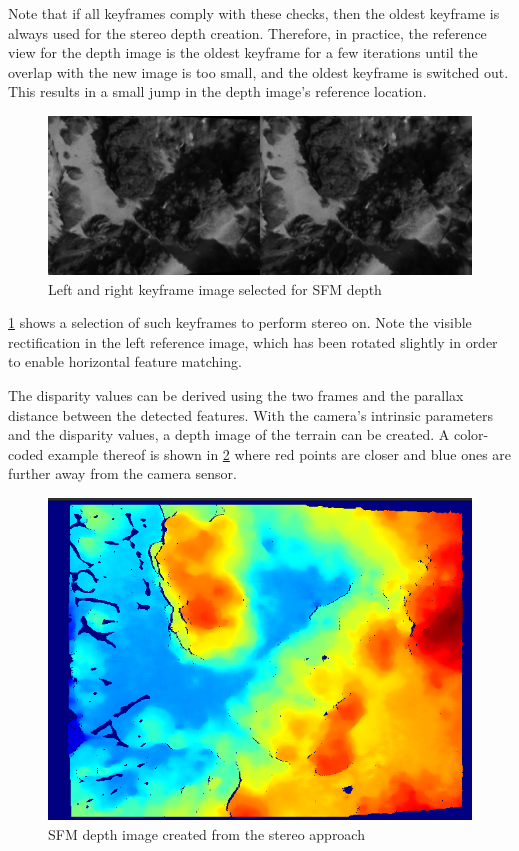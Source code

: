 \documentclass{article}
\begin{document}
Note that if all keyframes comply with these checks, then the oldest keyframe is always used for the stereo depth creation. Therefore, in practice, the reference view for the depth image is the oldest keyframe for a few iterations until the overlap with the new image is too small, and the oldest keyframe is switched out. This results in a small jump in the depth image's reference location. 

\begin{figure}[h]
\centering
\includegraphics[scale=0.28]{images/system_overview/sfm_images.png}
\caption{Left and right keyframe image selected for SFM depth}
\label{fig:sfm_images}
\end{figure}

\cref{fig:sfm_images} shows a selection of such keyframes to perform stereo on. Note the visible rectification in the left reference image, which has been rotated slightly in order to enable horizontal feature matching.

The disparity values can be derived using the two frames and the parallax distance between the detected features. With the camera's intrinsic parameters and the disparity values, a depth image of the terrain can be created. A color-coded example thereof is shown in \cref{fig:sfm_depth_image} where red points are closer and blue ones are further away from the camera sensor.

\begin{figure}[h]
\centering
\includegraphics[scale=0.45]{images/system_overview/sfm_depth_image.png}
\caption{SFM depth image created from the stereo approach}
\label{fig:sfm_depth_image}
\end{figure}
\end{document}
